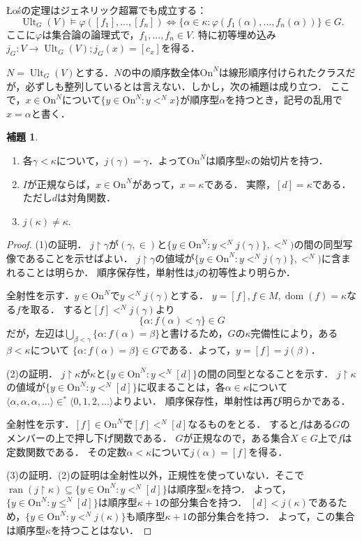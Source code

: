 \documentclass[uplatex]{jsarticle}
\newcommand{\range}{\operatorname{ran}}
\newcommand{\dom}{\operatorname{dom}}
\newcommand{\Ordinals}{\mathrm{On}}
\newcommand{\restrict}{\upharpoonright}
\newcommand{\Ult}{\operatorname{Ult}}
\newcommand{\seq}[1]{{\langle#1\rangle}}
\renewcommand\subset{\subseteq}
\theoremstyle{definition}
\newtheorem{lem}[thm]{補題}
\begin{document}
	Łośの定理はジェネリック超冪でも成立する：
	\[
	\Ult_G(V) \models \varphi([f_1], \dots, [f_n]) \iff \{ \alpha \in \kappa : \varphi(f_1(\alpha), \dots, f_n(\alpha)) \} \in G.
	\]
	ここに$\varphi$は集合論の論理式で，$f_1, \dots, f_n \in V$.
	特に初等埋め込み$j_G \colon V \to \Ult_G(V); j_G(x) = [c_x]$を得る．
	
	$N = \Ult_G(V)$とする．$N$の中の順序数全体$\Ordinals^N$は線形順序付けられたクラスだが，必ずしも整列しているとは言えない．しかし，次の補題は成り立つ．
	ここで，$x \in \Ordinals^N$について$\{ y \in \Ordinals^N : y <^N x \}$が順序型$\alpha$を持つとき，記号の乱用で$x = \alpha$と書く．
	
	\begin{lem}
		\begin{enumerate}
			\item 各$\gamma < \kappa$について，$j(\gamma) = \gamma$．よって$\Ordinals^N$は順序型$\kappa$の始切片を持つ．
			\item $I$が正規ならば，$x \in \Ordinals^N$があって，$x = \kappa$である．
			実際，$[d] = \kappa$である．ただし$d$は対角関数．
			\item $j(\kappa) \ne \kappa$.
		\end{enumerate}
	\end{lem}
	\begin{proof}
		(1)の証明．
		$j \upharpoonright \gamma$が$(\gamma, \in)$と$\{ y \in \Ordinals^N : y <^N j(\gamma)\}, <^N)$の間の同型写像であることを示せばよい．
		$j \upharpoonright \gamma$の値域が$\{ y \in \Ordinals^N : y <^N j(\gamma)\}, <^N)$に含まれることは明らか．
		順序保存性，単射性は$j$の初等性より明らか．
		
		全射性を示す．$y \in \Ordinals^N$で$y <^N j(\gamma)$とする．
		$y = [f], f \in M, \dom(f) = \kappa$なる$f$を取る．
		すると$[f] <^N j(\gamma)$より
		\[
		\{ \alpha : f(\alpha) < \gamma \} \in G
		\]
		だが，左辺は$\bigcup_{\beta < \gamma} \{\alpha : f(\alpha) = \beta \}$と書けるため，$G$の$\kappa$完備性により，ある$\beta < \kappa$について $\{\alpha : f(\alpha) = \beta\} \in G$である．よって，$y = [f] = j(\beta)$．
		
		(2)の証明．
		$j \upharpoonright \kappa$が$\kappa$と$\{ y \in \Ordinals^N : y <^N [d] \}$の間の同型となることを示す．
		$j \upharpoonright \kappa$の値域が$\{ y \in \Ordinals^N : y <^N [d] \}$に収まることは，各$\alpha \in \kappa$について$\seq{\alpha, \alpha, \alpha, \dots} \in^* \seq{0, 1, 2, \dots}$よりよい．
		順序保存性，単射性は再び明らかである．
		
		全射性を示す．$[f] \in \Ordinals^N$で$[f] <^N [d]$なるものをとる．
		すると$f$はある$G$のメンバーの上で押し下げ関数である．
		$G$が正規なので，ある集合$X \in G$上で$f$は定数関数である．
		その定数$\alpha < \kappa$について$j(\alpha) = [f]$を得る．
		
		(3)の証明．(2)の証明は全射性以外，正規性を使っていない．そこで$\range(j \restrict \kappa) \subset \{ y \in \Ordinals^N : y <^N [d] \}$は順序型$\kappa$を持つ．
		よって，$\{ y \in \Ordinals^N : y \le^N [d] \}$は順序型$\kappa + 1$の部分集合を持つ．
		$[d] < j(\kappa)$であるため，$\{ y \in \Ordinals^N : y <^N j(\kappa) \}$も順序型$\kappa + 1$の部分集合を持つ．
		よって，この集合は順序型$\kappa$を持つことはない．
	\end{proof}
	
\end{document}
